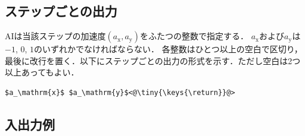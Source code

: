 \documentclass[11pt]{jarticle}
\begin{document}
\subsection{ステップごとの出力}\label{sec:output_step}
AIは当該ステップの加速度$(a_\mathrm{x},a_\mathrm{y})$をふたつの整数で指定する．
$a_\mathrm{x}$および$a_\mathrm{y}$は$-1$, $0$, $1$のいずれかでなければならない．
各整数はひとつ以上の空白で区切り，最後に改行を置く．以下にステップごとの出力の形式を示す．ただし空白は2つ以上あってもよい．

\begin{lstlisting}
$a_\mathrm{x}$ $a_\mathrm{y}$<@\tiny{\keys{\return}}@>
\end{lstlisting}

\subsection{入出力例}
\end{document}
